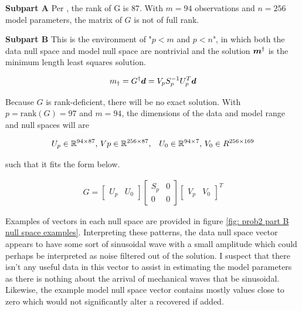\textbf{Subpart A} \newline
Per \MATLAB, the rank of G is $87$. With $m = 94$ observations and $n = 256$ model parameters, the matrix of $G$ is not of full rank.
\newline

\textbf{Subpart B} \newline
This is the environment of "$p < m$ and $p < n$", in which both the data null space and model null space are nontrivial and the solution $\boldsymbol{m}^\dagger$ is the minimum length least squares solution. 

\begin{align*}
	m_{\dagger} = G^\dagger \boldsymbol{d} = V_p S_p^{-1} U_p^T \boldsymbol{d}
\end{align*}

Because $G$ is rank-deficient, there will be no exact solution. With $p = \textrm{rank}\left(G\right) = 97$ and $m = 94$, the dimensions of the data and model range and null spaces will are

\begin{align*}
	U_p \in \mathbb{R}^{94 \times 87},\, Vp \in \mathbb{R}^{256 \times 87}, \,\,\,\,\, U_0 \in \mathbb{R}^{94 \times 7}, \, V_0 \in R^{256 \times 169}
\end{align*}

such that it fits the form below.

\begin{align*}
	G = \begin{bmatrix} U_p & U_0 \end{bmatrix} \begin{bmatrix} S_p & 0 \\ 0 & 0 \end{bmatrix} \begin{bmatrix} V_p & V_0 \end{bmatrix}^T  
\end{align*}

Examples of vectors in each null space are provided in figure \ref{fig: prob2 part B null space examples}. Interpreting these patterns, the data null space vector appears to have some sort of sinusoidal wave with a small amplitude which could perhaps be interpreted as noise filtered out of the solution. I suspect that there isn't any useful data in this vector to assist in estimating the model parameters as there is nothing about the arrival of mechanical waves that be sinusoidal. Likewise, the example model null space vector contains mostly values close to zero which would not significantly alter a recovered if added.  

